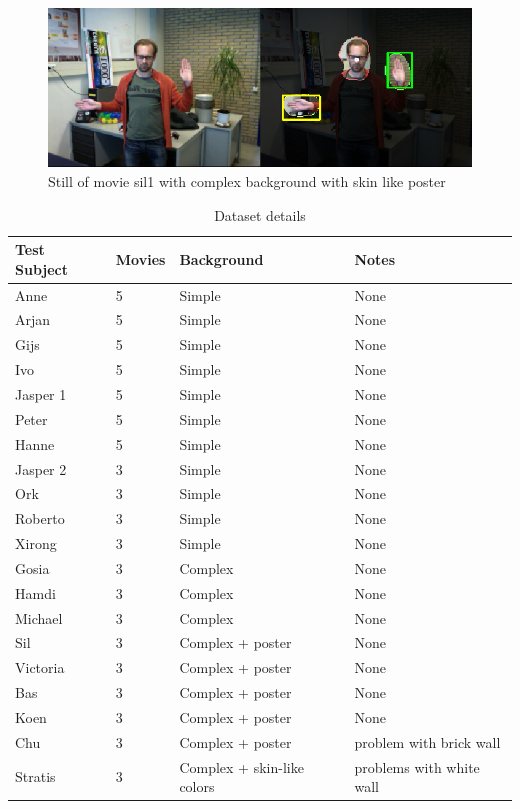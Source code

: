 \begin{figure}[htbp]
\center{}
\includegraphics[width=0.8\linewidth]{figures/complexposter.png}
\caption{Still of movie sil1 with complex background with skin like poster}
\label{fig:complexposterbackground}
\end{figure}


\begin{table}
\centering
\begin{tabular}{llll}
\hline\hline
	Test Subject & Movies & Background & Notes \\
\hline
	Anne     & 5 & Simple & None \\
	Arjan    & 5 & Simple & None \\
	Gijs     & 5 & Simple & None \\
	Ivo      & 5 & Simple & None \\
	Jasper 1 & 5 & Simple & None \\
	Peter    & 5 & Simple & None \\
	Hanne    & 5 & Simple & None \\
	Jasper 2 & 3 & Simple & None \\
	Ork      & 3 & Simple & None \\
	Roberto  & 3 & Simple & None \\
	Xirong   & 3 & Simple & None \\
	Gosia    & 3 & Complex & None \\
	Hamdi    & 3 & Complex & None \\
	Michael  & 3 & Complex & None \\
	Sil      & 3 & Complex + poster & None \\
	Victoria & 3 & Complex + poster & None \\
	Bas      & 3 & Complex + poster & None \\
	Koen     & 3 & Complex + poster & None \\
	Chu      & 3 & Complex + poster & problem with brick wall \\
	Stratis  & 3 & Complex + skin-like colors & problems with white wall \\
\hline
\end{tabular}
\caption{Dataset details}
\end{table}





